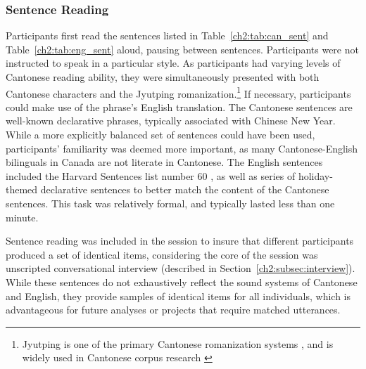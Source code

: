 \subsubsection{Sentence Reading}\label{ch2:subsec:sentences}
Participants first read the sentences listed in Table~\ref{ch2:tab:can_sent} and Table~\ref{ch2:tab:eng_sent} aloud, pausing between sentences. Participants were not instructed to speak in a particular style. As participants had varying levels of Cantonese reading ability, they were simultaneously presented with both Cantonese characters and the Jyutping romanization.\footnote{Jyutping is one of the primary Cantonese romanization systems \citep{matthews_2013_cantonese}, and is widely used in Cantonese corpus research \citep{nagy_2011_hlvc,tse_2019_heritage}} If necessary, participants could make use of the phrase's English translation. The Cantonese sentences are well-known declarative phrases, typically associated with Chinese New Year. While a more explicitly balanced set of sentences could have been used, participants' familiarity was deemed more important, as many Cantonese-English bilinguals in Canada are not literate in Cantonese. The English sentences included the Harvard Sentences list number 60 \citep{ieee_1969_sentences}, as well as series of holiday-themed declarative sentences to better match the content of the Cantonese sentences. This task was relatively formal, and typically lasted less than one minute. 

Sentence reading was included in the session to insure that different participants produced a set of identical items, considering the core of the session was unscripted conversational interview (described in Section~\ref{ch2:subsec:interview}). While these sentences do not exhaustively reflect the sound systems of Cantonese and English, they provide samples of identical items for all individuals, which is advantageous for future analyses or projects that require matched utterances.

